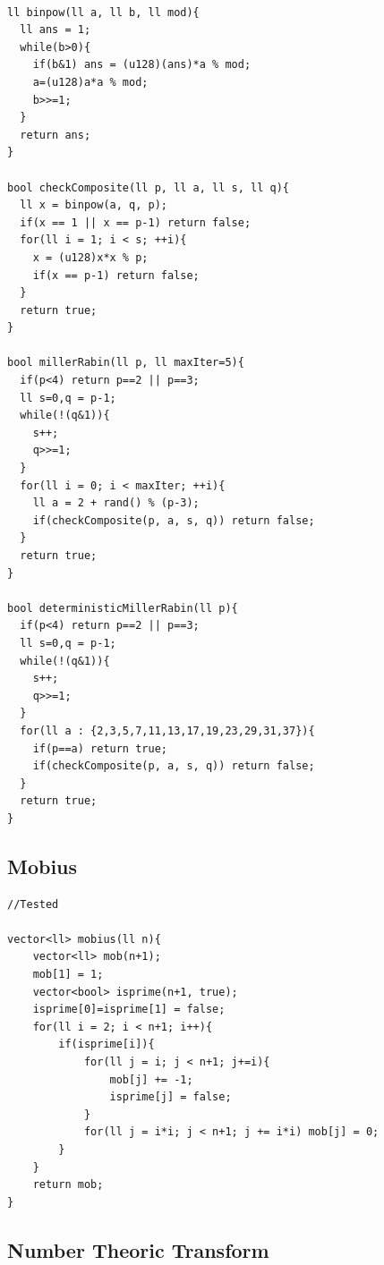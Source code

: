 \documentclass[10pt,a4paper,twocolumn]{article}
\begin{document}
	\begin{lstlisting}[style=cpp, title={miller-rabin.cpp}]

ll binpow(ll a, ll b, ll mod){
  ll ans = 1;
  while(b>0){
    if(b&1) ans = (u128)(ans)*a % mod;
    a=(u128)a*a % mod;
    b>>=1;
  }
  return ans;
}

bool checkComposite(ll p, ll a, ll s, ll q){
  ll x = binpow(a, q, p);
  if(x == 1 || x == p-1) return false;
  for(ll i = 1; i < s; ++i){
    x = (u128)x*x % p;
    if(x == p-1) return false;
  }
  return true;
}

bool millerRabin(ll p, ll maxIter=5){
  if(p<4) return p==2 || p==3;
  ll s=0,q = p-1;
  while(!(q&1)){
    s++;
    q>>=1;
  }
  for(ll i = 0; i < maxIter; ++i){
    ll a = 2 + rand() % (p-3);
    if(checkComposite(p, a, s, q)) return false;
  }
  return true;
}

bool deterministicMillerRabin(ll p){
  if(p<4) return p==2 || p==3;
  ll s=0,q = p-1;
  while(!(q&1)){
    s++;
    q>>=1;
  }
  for(ll a : {2,3,5,7,11,13,17,19,23,29,31,37}){
    if(p==a) return true;
    if(checkComposite(p, a, s, q)) return false;
  }
  return true;
}
	\end{lstlisting}

	\subsection{Mobius}
	
	\begin{lstlisting}[style=cpp, title={mobius.cpp}]
//Tested

vector<ll> mobius(ll n){
    vector<ll> mob(n+1);
    mob[1] = 1;
    vector<bool> isprime(n+1, true);
    isprime[0]=isprime[1] = false;
    for(ll i = 2; i < n+1; i++){
        if(isprime[i]){
            for(ll j = i; j < n+1; j+=i){
                mob[j] += -1;
                isprime[j] = false;
            }
            for(ll j = i*i; j < n+1; j += i*i) mob[j] = 0;
        }
    }
    return mob;
}
	\end{lstlisting}

	\subsection{Number Theoric Transform}
	
\end{document}
